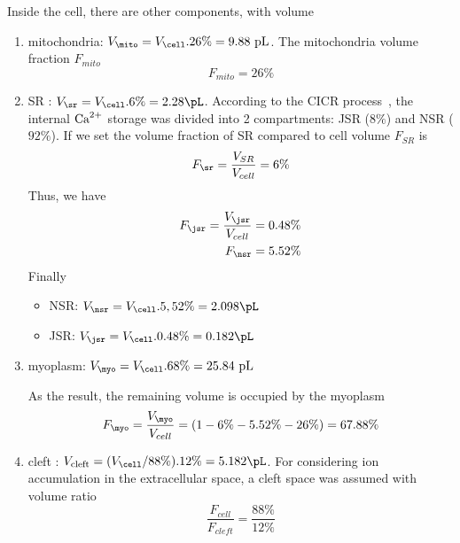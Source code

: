 Inside the cell, there are other components, with volume
\begin{enumerate}
\item mitochondria: $V_\mito = V_\cell .26\% = 9.88 \text{ pL}$.  The
  mitochondria volume fraction $F_{mito}$
  \begin{equation}
    \label{eq:755}
    F_{mito} = 26\%
  \end{equation}

\item SR : $V_\sr = V_\cell . 6\% = 2.28 \pL $. According to the CICR
  process~\citep{fabiato1975cic}, the internal ${\text{Ca}^{2+}}$ storage was
  divided into 2 compartments: JSR ($8\%$) and NSR ($92\%$). If we set
  the volume fraction of SR compared to cell volume $F_{SR}$ is
  \begin{equation}
    \label{eq:753}
    F_\sr = \frac{V_{SR}}{V_{cell}} = 6\% 
  \end{equation}
  Thus, we have
  \begin{equation}
    \label{eq:754}
    \begin{split}
      F_\jsr = \frac{V_\jsr}{V_{cell}} = 0.48\%  \\
      F_\nsr = 5.52\%
    \end{split}
  \end{equation}
  Finally
  \begin{itemize}
  \item NSR: $V_\nsr = V_\cell . 5,52\% = 2.098 \pL$
  \item JSR: $V_\jsr = V_\cell . 0.48\% = 0.182 \pL$
  \end{itemize}

\item myoplasm: $V_\myo = V_\cell .68\% = 25.84 \text{ pL}$

  As the result, the remaining volume is occupied by the myoplasm
  \begin{equation}
    \label{eq:756}
    F_\myo = \frac{V_\myo}{V_{cell}} = (1-6\%-5.52\%-26\%) = 67.88\%
  \end{equation}

\item cleft : $V_\text{cleft} = (V_\cell/88\%).12\% = 5.182\pL$. For considering ion accumulation in the extracellular space, a cleft
  space was assumed with volume ratio
  \begin{equation}
    \label{eq:757}
    \frac{F_{cell}}{F_{cleft}} = \frac{88\%}{12\%}
  \end{equation}
\end{enumerate}


